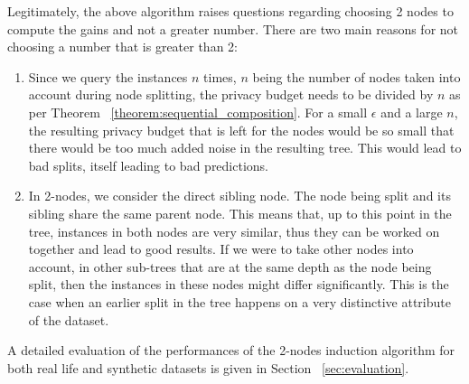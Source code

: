Legitimately, the above algorithm raises questions regarding choosing 2 nodes to compute the gains and not a greater number. There are two main reasons for not choosing a number that is greater than 2:

\begin{enumerate}
	\item Since we query the instances $n$ times, $n$ being the number of nodes taken into account during node splitting, the privacy budget needs to be divided by $n$ as per Theorem ~\ref{theorem:sequential_composition}. For a small $\epsilon$ and a large $n$, the resulting privacy budget that is left for the nodes would be so small that there would be too much added noise in the resulting tree. This would lead to bad splits, itself leading to bad predictions.
	\item In 2-nodes, we consider the direct sibling node. The node being split and its sibling share the same parent node. This means that, up to this point in the tree, instances in both nodes are very similar, thus they can be worked on together and lead to good results. If we were to take other nodes into account, in other sub-trees that are at the same depth as the node being split, then the instances in these nodes might differ significantly. This is the case when an earlier split in the tree happens on a very distinctive attribute of the dataset. 
\end{enumerate} 

A detailed evaluation of the performances of the 2-nodes induction algorithm for both real life and synthetic datasets is given in Section ~\ref{sec:evaluation}.
